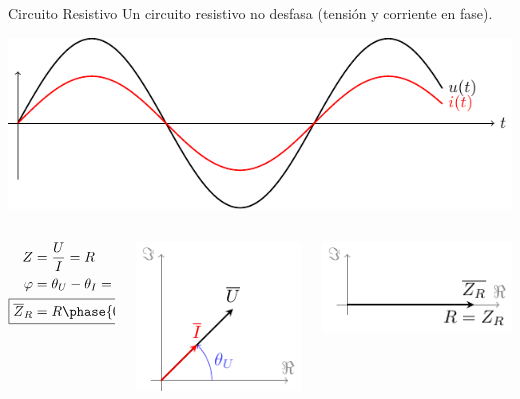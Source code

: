\documentclass[aspectratio=169, usenames,svgnames,dvipsnames]{beamer}
\begin{document}
\begin{frame}[label={sec:org91739f8}]{Circuito Resistivo}
Un circuito resistivo no desfasa (\alert{tensión y corriente en fase}).
\begin{center}
\includegraphics[height=0.3\textheight]{../figs/resistivo.pdf}
\end{center}

\begin{columns}
\begin{column}{0.3\columnwidth}
\begin{align*}
  Z &= \dfrac{U}{I} = R\\
  \varphi &= \theta_U - \theta_I = 0\\
  \Aboxed{\overline{Z}_R &= R \phase{0}}
\end{align*}
\end{column}

\begin{column}{0.35\columnwidth}
\begin{center}
\includegraphics[height=0.35\textheight]{../figs/fasorResistencia_VI.pdf}
\end{center}
\end{column}


\begin{column}{0.35\columnwidth}
\begin{center}
\includegraphics[height=0.25\textheight]{../figs/fasorResistencia.pdf}
\end{center}
\end{column}
\end{columns}
\end{frame}
\end{document}
